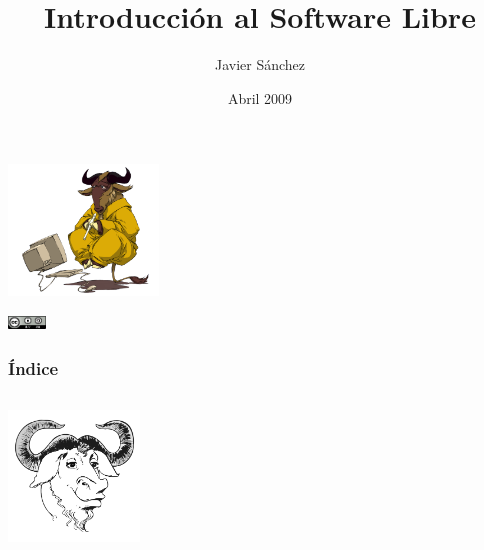 \documentclass{beamer}
\title{Introducción al Software Libre}
\author{Javier Sánchez}
\date{Abril 2009}
\institute[I.E. Juan Ramón Jiménez]
{Instituto Español Juan Ramón Jiménez \\ Casablanca}
\begin{document}
\begin{frame}
  \begin{center}
    \includegraphics[width=4cm]{pics/meditate.png}
  \end{center} 
  \titlepage
    \begin{center}
      \includegraphics[width=1cm]{pics/cc-by-sa.png}
    \end{center}
\end{frame}

\begin{frame}
  \frametitle{Índice}
  \begin{columns}
    \begin{flushright}
      \includegraphics[width=3.5cm]{pics/Official_gnu.pdf}
    \end{flushright}
    \tableofcontents
  \end{columns}
\end{frame}

\section[Resumen]{}
\end{document}
